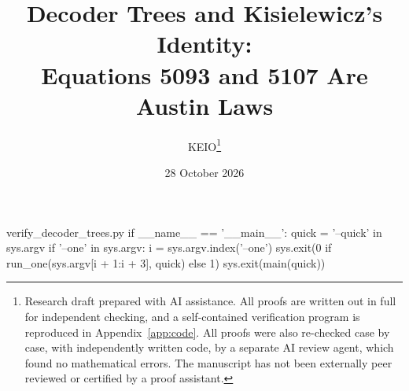 \begin{filecontents*}[overwrite]{verify_decoder_trees.py}
if __name__ == '__main__':
    quick = '--quick' in sys.argv
    if '--one' in sys.argv:
        i = sys.argv.index('--one')
        sys.exit(0 if run_one(sys.argv[i + 1:i + 3], quick) else 1)
    sys.exit(main(quick))
\end{filecontents*}
\documentclass[11pt,a4paper]{article}
\usepackage[margin=2.6cm]{geometry}
\usepackage{amsmath,amssymb,amsthm,mathtools}
\usepackage{enumitem}
\usepackage{xcolor}
\usepackage{listings}
\usepackage[hidelinks,hypertexnames=false]{hyperref}

\newtheorem{theorem}{Theorem}[section]
\newtheorem{proposition}[theorem]{Proposition}
\newtheorem{lemma}[theorem]{Lemma}
\newtheorem{corollary}[theorem]{Corollary}
\theoremstyle{definition}
\newtheorem{definition}[theorem]{Definition}
\newtheorem{example}[theorem]{Example}
\newtheorem{question}[theorem]{Question}
\theoremstyle{remark}
\newtheorem{remark}[theorem]{Remark}

\newcommand{\op}{\mathbin{\diamond}}
\newcommand{\T}{\mathcal{T}}
\newcommand{\N}{\mathcal{N}}
\newcommand{\pr}[2]{\langle #1,#2\rangle}
\newcommand{\tw}[3]{#1^{[#2]}#3}
\newcommand{\Dec}{D}
\newcommand{\Key}{K}
\newcommand{\Fire}{F}
\newcommand{\sub}{\sqsubset}
\newcommand{\Sub}{\operatorname{Sub}^{-}}
\newcommand{\E}[1]{\mathsf{E}_{#1}}
\newcommand{\G}[1]{\mathsf{G}_{#1}}

\lstset{basicstyle=\ttfamily\scriptsize,breaklines=true,columns=fullflexible,
  keepspaces=true,frame=single,showstringspaces=false}

\title{Decoder Trees and Kisielewicz's Identity:\\
Equations 5093 and 5107 Are Austin Laws}
\author{KEIO\thanks{Research draft prepared with AI assistance. All proofs are
written out in full for independent checking, and a self-contained verification
program is reproduced in Appendix~\ref{app:code}. All proofs were also re-checked
case by case, with independently written code, by a separate AI review agent,
which found no mathematical errors. The manuscript has not been externally peer
reviewed or certified by a proof assistant.}}
\date{28 October 2026}


\maketitle


